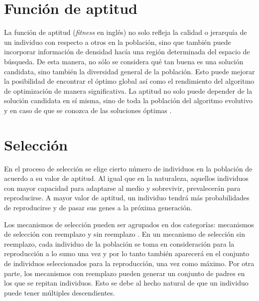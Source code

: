 \section{Función de aptitud}
La función de aptitud (\textit{fitness} en inglés) no solo refleja la calidad o jerarquía de un individuo con respecto a otros en la población, sino que también puede incorporar información de densidad hacía una región determinada del espacio de búsqueda. De esta manera, no sólo se considera qué tan buena es una solución candidata, sino también la diversidad general de la población. Esto puede mejorar la posibilidad de encontrar el óptimo global así como el rendimiento del algoritmo de optimización de manera significativa. La aptitud no solo puede depender de la solución candidata en sí misma, sino de toda la población del algoritmo evolutivo y en caso de que se conozca de las soluciones óptimas \cite{weise2009global}.
\section{Selección}\label{Seleccion}
En el proceso  de selección se elige cierto número de individuos en la población de acuerdo a su valor de aptitud. Al igual que en la naturaleza, aquellos individuos con mayor capacidad para adaptarse al medio y sobrevivir, prevalecerán para reproducirse. A mayor valor de aptitud, un individuo tendrá más probabilidades de reproducirse y de pasar sus genes a la próxima generación.
 
Los mecanismos de selección pueden ser agrupados en dos categorías: mecanismos de selección con reemplazo y sin reemplazo \cite{weise2009global}. En un mecanismo de selección sin reemplazo, cada individuo de la población se toma en consideración para la reproducción a lo sumo una vez y por lo tanto también aparecerá en el conjunto de individuos seleccionados para la reproducción, una vez como máximo. Por otra parte, los mecanismos con  reemplazo pueden generar un conjunto de padres en los que se repitan individuos. Esto se debe al hecho natural de que un individuo puede tener múltiples descendientes.

